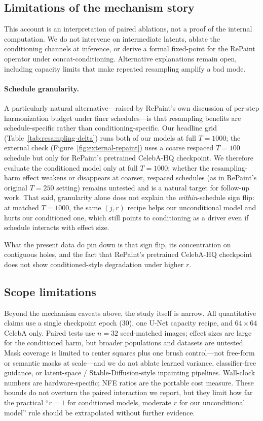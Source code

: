 \subsection{Limitations of the mechanism story}
This account is an interpretation of paired ablations, not a proof of the internal computation.
We do not intervene on intermediate latents, ablate the conditioning channels at inference, or derive a formal fixed-point for the RePaint operator under concat-conditioning.
Alternative explanations remain open, including capacity limits that make repeated resampling amplify a bad mode.

\paragraph{Schedule granularity.}
A particularly natural alternative---raised by RePaint's own discussion of per-step harmonization budget under finer schedules---is that resampling benefits are schedule-specific rather than conditioning-specific.
Our headline grid (Table~\ref{tab:resampling-delta}) runs both of our models at full $T{=}1000$; the external check (Figure~\ref{fig:external-repaint}) uses a coarse respaced $T{=}100$ schedule but only for RePaint's pretrained CelebA-HQ checkpoint.
We therefore evaluate the conditioned model only at full $T{=}1000$; whether the resampling-harm effect weakens or disappears at coarser, respaced schedules (as in RePaint's original $T{=}250$ setting) remains untested and is a natural target for follow-up work.
That said, granularity alone does not explain the \emph{within}-schedule sign flip: at matched $T{=}1000$, the same $(j,r)$ recipe helps our unconditional model and hurts our conditioned one, which still points to conditioning as a driver even if schedule interacts with effect size.

What the present data do pin down is that sign flip, its concentration on contiguous holes, and the fact that RePaint's pretrained CelebA-HQ checkpoint does not show conditioned-style degradation under higher $r$.

\subsection{Scope limitations}
Beyond the mechanism caveats above, the study itself is narrow.
All quantitative claims use a single checkpoint epoch ($30$), one U-Net capacity recipe, and $64{\times}64$ CelebA only.
Paired tests use $n{=}32$ seed-matched images; effect sizes are large for the conditioned harm, but broader populations and datasets are untested.
Mask coverage is limited to center squares plus one brush control---not free-form or semantic masks at scale---and we do not ablate learned variance, classifier-free guidance, or latent-space / Stable-Diffusion-style inpainting pipelines.
Wall-clock numbers are hardware-specific; NFE ratios are the portable cost measure.
These bounds do not overturn the paired interaction we report, but they limit how far the practical ``$r{=}1$ for conditioned models, moderate $r$ for our unconditional model'' rule should be extrapolated without further evidence.
